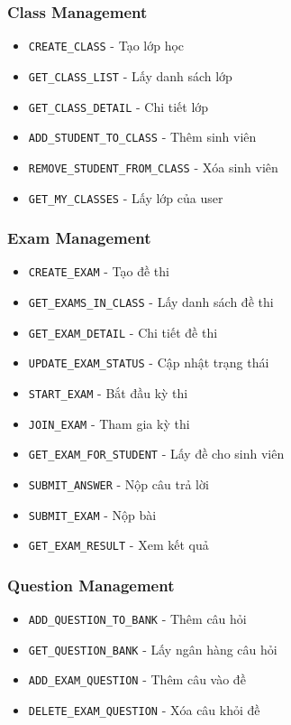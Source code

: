 ﻿\documentclass[12pt,a4paper]{report}
\begin{document}
\subsubsection{Class Management}
\begin{itemize}
    \item \texttt{CREATE\_CLASS} - Tạo lớp học
    \item \texttt{GET\_CLASS\_LIST} - Lấy danh sách lớp
    \item \texttt{GET\_CLASS\_DETAIL} - Chi tiết lớp
    \item \texttt{ADD\_STUDENT\_TO\_CLASS} - Thêm sinh viên
    \item \texttt{REMOVE\_STUDENT\_FROM\_CLASS} - Xóa sinh viên
    \item \texttt{GET\_MY\_CLASSES} - Lấy lớp của user
\end{itemize}

\subsubsection{Exam Management}
\begin{itemize}
    \item \texttt{CREATE\_EXAM} - Tạo đề thi
    \item \texttt{GET\_EXAMS\_IN\_CLASS} - Lấy danh sách đề thi
    \item \texttt{GET\_EXAM\_DETAIL} - Chi tiết đề thi
    \item \texttt{UPDATE\_EXAM\_STATUS} - Cập nhật trạng thái
    \item \texttt{START\_EXAM} - Bắt đầu kỳ thi
    \item \texttt{JOIN\_EXAM} - Tham gia kỳ thi
    \item \texttt{GET\_EXAM\_FOR\_STUDENT} - Lấy đề cho sinh viên
    \item \texttt{SUBMIT\_ANSWER} - Nộp câu trả lời
    \item \texttt{SUBMIT\_EXAM} - Nộp bài
    \item \texttt{GET\_EXAM\_RESULT} - Xem kết quả
\end{itemize}

\subsubsection{Question Management}
\begin{itemize}
    \item \texttt{ADD\_QUESTION\_TO\_BANK} - Thêm câu hỏi
    \item \texttt{GET\_QUESTION\_BANK} - Lấy ngân hàng câu hỏi
    \item \texttt{ADD\_EXAM\_QUESTION} - Thêm câu vào đề
    \item \texttt{DELETE\_EXAM\_QUESTION} - Xóa câu khỏi đề
\end{itemize}
\end{document}
